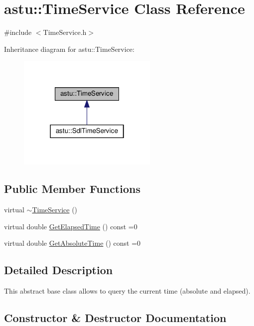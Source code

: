 \hypertarget{classastu_1_1TimeService}{}\section{astu\+:\+:Time\+Service Class Reference}
\label{classastu_1_1TimeService}


{\ttfamily \#include $<$Time\+Service.\+h$>$}



Inheritance diagram for astu\+:\+:Time\+Service\+:\nopagebreak
\begin{figure}[H]
\begin{center}
\leavevmode
\includegraphics[width=190pt]{classastu_1_1TimeService__inherit__graph}
\end{center}
\end{figure}
\subsection*{Public Member Functions}
\begin{DoxyCompactItemize}
\item 
virtual \hyperlink{classastu_1_1TimeService_aee6102fc58ba56c7b40cceb32b684657}{$\sim$\+Time\+Service} ()
\item 
virtual double \hyperlink{classastu_1_1TimeService_af3b4f5f1b64d87e6fd8a2b81c48a2bf4}{Get\+Elapsed\+Time} () const =0
\item 
virtual double \hyperlink{classastu_1_1TimeService_a4c2eb07963ed65649f17e331ff20735a}{Get\+Absolute\+Time} () const =0
\end{DoxyCompactItemize}


\subsection{Detailed Description}
This abstract base class allows to query the current time (absolute and elapsed). 

\subsection{Constructor \& Destructor Documentation}
\mbox{\label{classastu_1_1TimeService_aee6102fc58ba56c7b40cceb32b684657}} 
